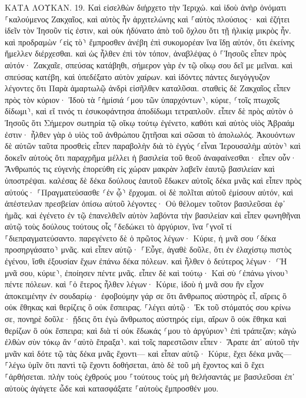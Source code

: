\documentclass[twoside, 9pt]{extreport}
\begin{document}
ΚΑΤΑ ΛΟΥΚΑΝ.
19.
Καὶ εἰσελθὼν διήρχετο τὴν Ἰεριχώ. 
καὶ ἰδοὺ ἀνὴρ ὀνόματι ⸀καλούμενος Ζακχαῖος, καὶ αὐτὸς ἦν ἀρχιτελώνης καὶ ⸀αὐτὸς πλούσιος· 
καὶ ἐζήτει ἰδεῖν τὸν Ἰησοῦν τίς ἐστιν, καὶ οὐκ ἠδύνατο ἀπὸ τοῦ ὄχλου ὅτι τῇ ἡλικίᾳ μικρὸς ἦν. 
καὶ προδραμὼν ⸂εἰς τὸ⸃ ἔμπροσθεν ἀνέβη ἐπὶ συκομορέαν ἵνα ἴδῃ αὐτόν, ὅτι ἐκείνης ἤμελλεν διέρχεσθαι. 
καὶ ὡς ἦλθεν ἐπὶ τὸν τόπον, ἀναβλέψας ὁ ⸀Ἰησοῦς εἶπεν πρὸς αὐτόν· Ζακχαῖε, σπεύσας κατάβηθι, σήμερον γὰρ ἐν τῷ οἴκῳ σου δεῖ με μεῖναι. 
καὶ σπεύσας κατέβη, καὶ ὑπεδέξατο αὐτὸν χαίρων. 
καὶ ἰδόντες πάντες διεγόγγυζον λέγοντες ὅτι Παρὰ ἁμαρτωλῷ ἀνδρὶ εἰσῆλθεν καταλῦσαι. 
σταθεὶς δὲ Ζακχαῖος εἶπεν πρὸς τὸν κύριον· Ἰδοὺ τὰ ⸀ἡμίσιά ⸂μου τῶν ὑπαρχόντων⸃, κύριε, ⸂τοῖς πτωχοῖς δίδωμι⸃, καὶ εἴ τινός τι ἐσυκοφάντησα ἀποδίδωμι τετραπλοῦν. 
εἶπεν δὲ πρὸς αὐτὸν ὁ Ἰησοῦς ὅτι Σήμερον σωτηρία τῷ οἴκῳ τούτῳ ἐγένετο, καθότι καὶ αὐτὸς υἱὸς Ἀβραάμ ἐστιν· 
ἦλθεν γὰρ ὁ υἱὸς τοῦ ἀνθρώπου ζητῆσαι καὶ σῶσαι τὸ ἀπολωλός. 
Ἀκουόντων δὲ αὐτῶν ταῦτα προσθεὶς εἶπεν παραβολὴν διὰ τὸ ἐγγὺς ⸂εἶναι Ἰερουσαλὴμ αὐτὸν⸃ καὶ δοκεῖν αὐτοὺς ὅτι παραχρῆμα μέλλει ἡ βασιλεία τοῦ θεοῦ ἀναφαίνεσθαι· 
εἶπεν οὖν· Ἄνθρωπός τις εὐγενὴς ἐπορεύθη εἰς χώραν μακρὰν λαβεῖν ἑαυτῷ βασιλείαν καὶ ὑποστρέψαι. 
καλέσας δὲ δέκα δούλους ἑαυτοῦ ἔδωκεν αὐτοῖς δέκα μνᾶς καὶ εἶπεν πρὸς αὐτούς· ⸀Πραγματεύσασθε ⸂ἐν ᾧ⸃ ἔρχομαι. 
οἱ δὲ πολῖται αὐτοῦ ἐμίσουν αὐτόν, καὶ ἀπέστειλαν πρεσβείαν ὀπίσω αὐτοῦ λέγοντες· Οὐ θέλομεν τοῦτον βασιλεῦσαι ἐφ᾽ ἡμᾶς. 
καὶ ἐγένετο ἐν τῷ ἐπανελθεῖν αὐτὸν λαβόντα τὴν βασιλείαν καὶ εἶπεν φωνηθῆναι αὐτῷ τοὺς δούλους τούτους οἷς ⸀δεδώκει τὸ ἀργύριον, ἵνα ⸀γνοῖ τί ⸀διεπραγματεύσαντο. 
παρεγένετο δὲ ὁ πρῶτος λέγων· Κύριε, ἡ μνᾶ σου ⸂δέκα προσηργάσατο⸃ μνᾶς. 
καὶ εἶπεν αὐτῷ· ⸀Εὖγε, ἀγαθὲ δοῦλε, ὅτι ἐν ἐλαχίστῳ πιστὸς ἐγένου, ἴσθι ἐξουσίαν ἔχων ἐπάνω δέκα πόλεων. 
καὶ ἦλθεν ὁ δεύτερος λέγων· ⸂Ἡ μνᾶ σου, κύριε⸃, ἐποίησεν πέντε μνᾶς. 
εἶπεν δὲ καὶ τούτῳ· Καὶ σὺ ⸂ἐπάνω γίνου⸃ πέντε πόλεων. 
καὶ ⸀ὁ ἕτερος ἦλθεν λέγων· Κύριε, ἰδοὺ ἡ μνᾶ σου ἣν εἶχον ἀποκειμένην ἐν σουδαρίῳ· 
ἐφοβούμην γάρ σε ὅτι ἄνθρωπος αὐστηρὸς εἶ, αἴρεις ὃ οὐκ ἔθηκας καὶ θερίζεις ὃ οὐκ ἔσπειρας. 
⸀λέγει αὐτῷ· Ἐκ τοῦ στόματός σου κρίνω σε, πονηρὲ δοῦλε· ᾔδεις ὅτι ἐγὼ ἄνθρωπος αὐστηρός εἰμι, αἴρων ὃ οὐκ ἔθηκα καὶ θερίζων ὃ οὐκ ἔσπειρα; 
καὶ διὰ τί οὐκ ἔδωκάς ⸂μου τὸ ἀργύριον⸃ ἐπὶ τράπεζαν; κἀγὼ ἐλθὼν σὺν τόκῳ ἂν ⸂αὐτὸ ἔπραξα⸃. 
καὶ τοῖς παρεστῶσιν εἶπεν· Ἄρατε ἀπ᾽ αὐτοῦ τὴν μνᾶν καὶ δότε τῷ τὰς δέκα μνᾶς ἔχοντι— 
καὶ εἶπαν αὐτῷ· Κύριε, ἔχει δέκα μνᾶς— 
⸀λέγω ὑμῖν ὅτι παντὶ τῷ ἔχοντι δοθήσεται, ἀπὸ δὲ τοῦ μὴ ἔχοντος καὶ ὃ ἔχει ⸀ἀρθήσεται. 
πλὴν τοὺς ἐχθρούς μου ⸀τούτους τοὺς μὴ θελήσαντάς με βασιλεῦσαι ἐπ᾽ αὐτοὺς ἀγάγετε ὧδε καὶ κατασφάξατε ⸀αὐτοὺς ἔμπροσθέν μου. 
\end{document}
